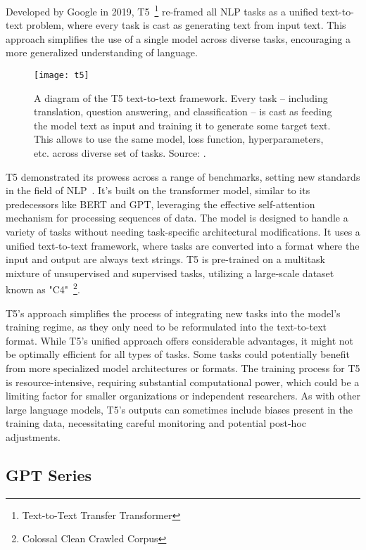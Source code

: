 Developed by Google in 2019, T5~\footnote{Text-to-Text Transfer Transformer} re-framed all NLP tasks as a unified text-to-text problem, where every task is cast as generating text from input text.
This approach simplifies the use of a single model across diverse tasks, encouraging a more generalized understanding of language.

\begin{figure}[h!]
	\centering
	\texttt{[image: t5]}
	\caption{A diagram of the T5 text-to-text framework. Every task -- including translation, question answering, and classification -- is cast as feeding the model text as input and training it to generate some target text. This allows to use the same model, loss function, hyperparameters, etc. across diverse set of tasks. Source: \protect\textcite{raffel2023exploring}.}
	\label{fig:t5-t2t}
\end{figure}

T5 demonstrated its prowess across a range of benchmarks, setting new standards in the field of NLP~\cite{raffel2023exploring}.
It's built on the transformer model, similar to its predecessors like BERT and GPT, leveraging the effective self-attention mechanism for processing sequences of data.
The model is designed to handle a variety of tasks without needing task-specific architectural modifications.
It uses a unified text-to-text framework, where tasks are converted into a format where the input and output are always text strings.
T5 is pre-trained on a multitask mixture of unsupervised and supervised tasks, utilizing a large-scale dataset known as "C4"~\footnote{Colossal Clean Crawled Corpus}.

T5's approach simplifies the process of integrating new tasks into the model's training regime, as they only need to be reformulated into the text-to-text format.
While T5's unified approach offers considerable advantages, it might not be optimally efficient for all types of tasks.
Some tasks could potentially benefit from more specialized model architectures or formats.
The training process for T5 is resource-intensive, requiring substantial computational power, which could be a limiting factor for smaller organizations or independent researchers.
As with other large language models, T5's outputs can sometimes include biases present in the training data, necessitating careful monitoring and potential post-hoc adjustments.

\subsection{GPT Series}
\label{subsec:gpt-series}

